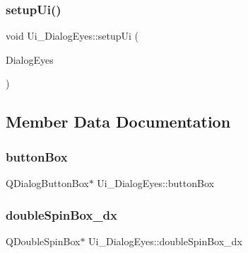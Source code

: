 \hypertarget{class_ui___dialog_eyes_a51ce884bcab7ca170ca7b45f25dd93be}{}\label{class_ui___dialog_eyes_a51ce884bcab7ca170ca7b45f25dd93be} 
\subsubsection{\texorpdfstring{setup\+Ui()}{setupUi()}}
{\footnotesize\ttfamily void Ui\+\_\+\+Dialog\+Eyes\+::setup\+Ui (\begin{DoxyParamCaption}\item[{Q\+Dialog $\ast$}]{Dialog\+Eyes }\end{DoxyParamCaption})\hspace{0.3cm}{\ttfamily [inline]}}



\subsection{Member Data Documentation}
\hypertarget{class_ui___dialog_eyes_ae39373bb3f9ab9b0ccc6dd2d999667c6}{}\label{class_ui___dialog_eyes_ae39373bb3f9ab9b0ccc6dd2d999667c6} 
\subsubsection{\texorpdfstring{button\+Box}{buttonBox}}
{\footnotesize\ttfamily Q\+Dialog\+Button\+Box$\ast$ Ui\+\_\+\+Dialog\+Eyes\+::button\+Box}

\hypertarget{class_ui___dialog_eyes_aababf5f01ccf0009e1131403900b1cae}{}\label{class_ui___dialog_eyes_aababf5f01ccf0009e1131403900b1cae} 
\subsubsection{\texorpdfstring{double\+Spin\+Box\+\_\+dx}{doubleSpinBox\_dx}}
{\footnotesize\ttfamily Q\+Double\+Spin\+Box$\ast$ Ui\+\_\+\+Dialog\+Eyes\+::double\+Spin\+Box\+\_\+dx}

\hypertarget{class_ui___dialog_eyes_a118542559787e7f13ed3e02ff70adb84}{}\label{class_ui___dialog_eyes_a118542559787e7f13ed3e02ff70adb84} 
